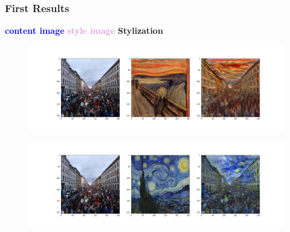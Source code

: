 \documentclass[11pt,xcolor=dvipsnames]{beamer}
\begin{document}
\begin{frame}
\frametitle{First Results}

\begin{center}
\textcolor{blue}{\textbf{content image}} \hspace{0.5cm}  \textcolor{Plum}{\textbf{style image}} \hspace{0.75cm} \textbf{Stylization}

\begin{figure}
	\includegraphics[width=1.0\linewidth]{scream_adain_3001.png}
\end{figure}

\vspace{-1cm}

\begin{figure}
	\includegraphics[width=1.0\linewidth]{starry_night_relu4_1e-2_lr1e-4.png}
\end{figure}

\end{center}

\end{frame}
\end{document}
